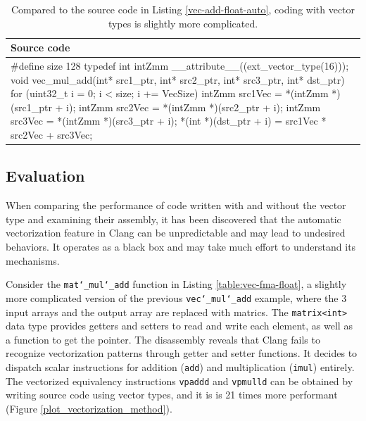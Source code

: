 \documentclass[logo,bsc,singlespacing,parskip]{infthesis}
\newenvironment{VerbatimCompact}
  {\vspace*{-2.5mm}\VerbatimEnvironment
   \par\Verbatim}
  {\endVerbatim\vspace*{-2.4mm}}
\begin{document}
\begin{table}[ht]\captionsetup{name=Listing}
\begin{tabular}{>{\raggedright\arraybackslash}p{13cm}}
    Source code\\
    \midrule
    \begin{VerbatimCompact}
#define size 128
typedef int intZmm __attribute__((ext_vector_type(16)));
void vec_mul_add(int* src1_ptr, int* src2_ptr, 
                 int* src3_ptr, int* dst_ptr) {
    for (uint32_t i = 0; i < size; i += VecSize){
        intZmm src1Vec = *(intZmm *)(src1_ptr + i);
        intZmm src2Vec = *(intZmm *)(src2_ptr + i);
        intZmm src3Vec = *(intZmm *)(src3_ptr + i);
        *(int *)(dst_ptr + i) = src1Vec * src2Vec + src3Vec;
    }
}
\end{VerbatimCompact}
\end{tabular}
\caption{Compared to the source code in Listing \ref{vec-add-float-auto},
coding with vector types is slightly more complicated.}
\label{vec-add-float-vecty}
\end{table}
\subsection{Evaluation}

\label{sec:vectorization-method-eval}
When comparing the performance of code written with and without the vector type and examining their assembly, it has been discovered that the automatic vectorization feature in Clang can be unpredictable and may lead to undesired behaviors. It operates as a black box and may take much effort to understand its mechanisms. 

Consider the \texttt{mat\char`_mul\char`_add} function in Listing \ref{table:vec-fma-float}, a slightly more complicated version of the previous \texttt{vec\char`_mul\char`_add} example, where the 3 input arrays and the output array are replaced with matrics. The \texttt{matrix<int>} data type provides getters and setters to read and write each element, as well as a function to get the pointer. The disassembly reveals that Clang fails to recognize vectorization patterns through getter and setter functions. It decides to dispatch scalar instructions for addition (\texttt{add}) and multiplication (\texttt{imul}) entirely.
The vectorized equivalency instructions \texttt{vpaddd} and \texttt{vpmulld} 
can be obtained by writing source code using vector types, and it is
is 21 times more performant (Figure \ref{plot_vectorization_method}).
\end{document}
